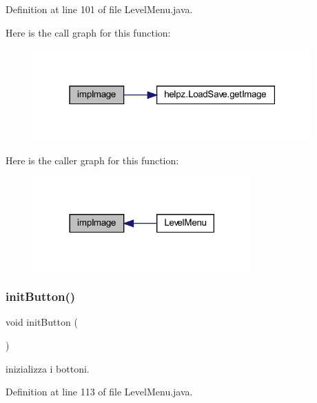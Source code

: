Definition at line 101 of file Level\+Menu.\+java.

Here is the call graph for this function\+:\nopagebreak
\begin{figure}[H]
\begin{center}
\leavevmode
\includegraphics[width=303pt]{classui_1_1_level_menu_aded9c531b53772fd90d09a8b6bf0132e_cgraph}
\end{center}
\end{figure}
Here is the caller graph for this function\+:\nopagebreak
\begin{figure}[H]
\begin{center}
\leavevmode
\includegraphics[width=237pt]{classui_1_1_level_menu_aded9c531b53772fd90d09a8b6bf0132e_icgraph}
\end{center}
\end{figure}
\mbox{\label{classui_1_1_level_menu_aed9fe7e919d4355a7ad86701d44e1fea}} 
\subsubsection{\texorpdfstring{init\+Button()}{initButton()}}
{\footnotesize\ttfamily void init\+Button (\begin{DoxyParamCaption}{ }\end{DoxyParamCaption})\hspace{0.3cm}{\ttfamily [private]}}



inizializza i bottoni. 



Definition at line 113 of file Level\+Menu.\+java.


